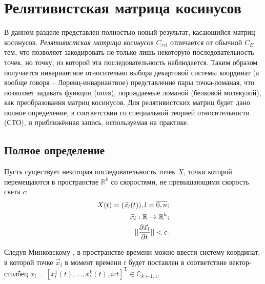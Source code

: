 

\section{Релятивистская матрица косинусов}

В данном разделе представлен полностью новый результат, касающийся матриц косинусов. \textit{Релятивистская матрица косинусов $C_{rel}$} отличается от обычной $C_E$ тем, что позволяет закодировать не только лишь некоторую последовательность точек, но точку, из которой эта последовательность наблюдается. Таким образом получается инвариантное относительно выбора декартовой системы координат (а вообще говоря -- Лоренц-инвариантное) представление пары точка-ломаная, что позволяет задавать функции (поля), порождаемые ломаной (белковой молекулой), как преобразования матриц косинусов. Для релятивистских матриц будет дано полное определение, в соответствии со специальной теорией относительности (СТО), и приближённая запись, используемая на практике.

\subsection{Полное определение}

Пусть существует некоторая последовательность точек $X$, точки которой перемещаются в пространстве $\mathbb{R}^{k}$ со скоростями, не превышающими скорость света $c$:
\begin{align}
	X(t) = (\vec{x}_{l}(t)), l = \overline{0,n}; \\
	\vec{x}_l : \mathbb{R} \rightarrow \mathbb{R}^{k}; \notag \\
	||\frac{\partial{\vec{x}_l}}{\partial{t}}|| < c. \notag
\end{align}

Следуя Минковскому \cite{field_theory}, в пространстве-времени можно ввести систему координат, в которой точке $\vec{x}_l$ в момент времени $t$ будет поставлен в соответствие вектор-столбец $x_l = [x^1_l(t), ..., x^k_l(t), ict]^\mathrm{T} \in \mathbb{C}_{k+1,1}$.

